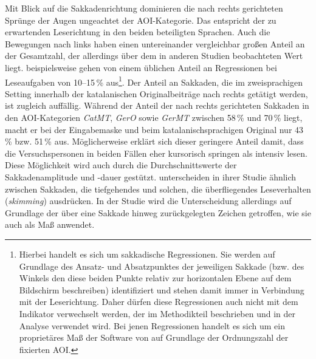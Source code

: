 
Mit Blick auf die Sakkadenrichtung dominieren die nach rechts gerichteten Sprünge der Augen ungeachtet der AOI-Kategorie. Das entspricht der zu erwartenden Leserichtung in den beiden beteiligten Sprachen. Auch die Bewegungen nach links haben einen untereinander vergleichbar großen Anteil an der Gesamtzahl, der allerdings über dem in anderen Studien beobachteten Wert liegt. \citet[6]{buscher_attentive_2012} beispielsweise gehen von einem üblichen Anteil an Regressionen bei Leseaufgaben von 10--15\,\% aus\footnote{Hierbei handelt es sich um sakkadische Regressionen. Sie werden auf Grundlage des Ansatz- und Absatzpunktes der jeweiligen Sakkade (bzw. des Winkels den diese beiden Punkte relativ zur horizontalen Ebene auf dem Bildschirm beschreiben) identifiziert und stehen damit immer in Verbindung mit der Leserichtung. Daher dürfen diese Regressionen auch nicht mit dem Indikator verwechselt werden, der im Methodikteil beschrieben und in der Analyse verwendet wird. Bei jenen Regressionen handelt es sich um ein proprietäres Maß der Software von \citeauthor{sr_research_ltd_eyelink_2019} auf Grundlage der Ordnungszahl der fixierten AOI.}. Der Anteil an Sakkaden, die im zweisprachigen Setting innerhalb der katalanischen Originalbeiträge nach rechts getätigt werden, ist zugleich auffällig. Während der Anteil der nach rechts gerichteten Sakkaden in den AOI-Kategorien \emph{CatMT}, \emph{GerO} sowie \emph{GerMT} zwischen 58\,\% und 70\,\% liegt, macht er bei der Eingabemaske und beim katalanischsprachigen Original nur 43\,\% bzw. 51\,\% aus. Möglicherweise erklärt sich dieser geringere Anteil damit, dass die Versuchspersonen in beiden Fällen eher kursorisch springen als intensiv lesen. Diese Möglichkeit wird auch durch die Durchschnittswerte der Sakkadenamplitude und -dauer gestützt. \citet[124]{biedert_reading_2012} unterscheiden in ihrer Studie ähnlich zwischen Sakkaden, die tiefgehendes und solchen, die überfliegendes Leseverhalten (\emph{skimming}) ausdrücken. In der Studie wird die Unterscheidung allerdings auf Grundlage der über eine Sakkade hinweg zurückgelegten Zeichen getroffen, wie sie auch \citet[379\psq]{rayner_eye_1998} als Maß anwendet.

